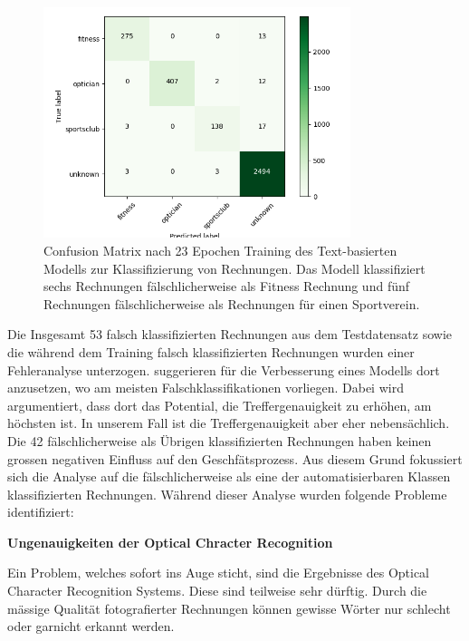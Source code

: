 \begin{figure}[h!] 
    \caption[Confusion Matrix des Text-basierten Modells zur Klassifizierung von Rechnungen]{Confusion Matrix nach 23 Epochen Training des Text-basierten Modells zur Klassifizierung von Rechnungen. Das Modell klassifiziert sechs Rechnungen fälschlicherweise als Fitness Rechnung und fünf Rechnungen fälschlicherweise als Rechnungen für einen Sportverein.}
    \label{text-classification-cm}
    \centering
    \includegraphics[width=0.8\textwidth]{graphics/text-classification/cm_22.png}
\end{figure}

Die Insgesamt 53 falsch klassifizierten Rechnungen aus dem Testdatensatz sowie die während dem Training falsch klassifizierten Rechnungen wurden einer Fehleranalyse unterzogen. \textcite{MLYearning} suggerieren für die Verbesserung eines Modells dort anzusetzen, wo am meisten Falschklassifikationen vorliegen. Dabei wird argumentiert, dass dort das Potential, die Treffergenauigkeit zu erhöhen, am höchsten ist. In unserem Fall ist die Treffergenauigkeit aber eher nebensächlich. Die 42 fälschlicherweise als Übrigen klassifizierten Rechnungen haben keinen grossen negativen Einfluss auf den Geschfätsprozess. Aus diesem Grund fokussiert sich die Analyse auf die fälschlicherweise als eine der automatisierbaren Klassen klassifizierten Rechnungen. Während dieser Analyse wurden folgende Probleme identifiziert:

\textbf{Ungenauigkeiten der Optical Chracter Recognition}

Ein Problem, welches sofort ins Auge sticht, sind die Ergebnisse des Optical Character Recognition Systems. Diese sind teilweise sehr dürftig. Durch die mässige Qualität fotografierter Rechnungen können gewisse Wörter nur schlecht oder garnicht erkannt werden. 

